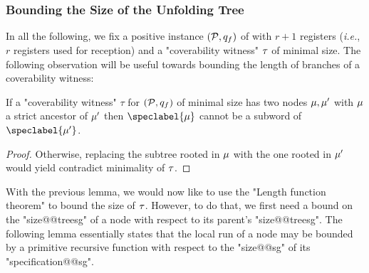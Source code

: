\subsubsection{Bounding the Size of the Unfolding Tree}
In all the following, we fix a positive instance $(\mathcal{P},q_f)$ of \COVER with $r+1$ registers (\emph{i.e.}, $r$ registers used for reception) and a  "coverability witness" $\tau$ of minimal size.
The following observation will be useful towards bounding the length of branches of a coverability witness:

\begin{lemma}
\label{lem:no_subword_in_branch_sg}
If a "coverability witness" $\tau$ for $(\mathcal{P}, q_f)$ of minimal size has two nodes $\mu, \mu'$ with $\mu$ a strict ancestor of $\mu'$ then  $\speclabel{\node}$ cannot be a subword of $\speclabel{\node'}$. 
\end{lemma}
\begin{proof}
Otherwise, replacing the subtree rooted in $\mu$ with the one rooted in $\mu'$ would yield contradict minimality of $\tau$.
\end{proof}

With the previous lemma, we would now like to use the "Length function theorem" to bound the size of $\tau$. However, to do that, we first need a bound on the "size@@treesg" of a node with respect to its parent's "size@@treesg". The following lemma essentially states that the local run of a node may be bounded by a primitive recursive function with respect to the "size@@sg" of its "specification@@sg".

